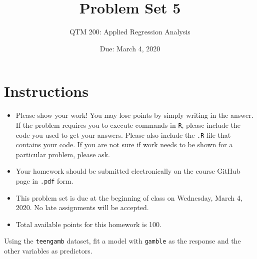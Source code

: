 \documentclass[12pt,letterpaper]{article}
\title{Problem Set 5}
\date{Due: March 4, 2020}
\author{QTM 200: Applied Regression Analysis}
\begin{document}
	\maketitle
	
	\section*{Instructions}
	\begin{itemize}
		\item Please show your work! You may lose points by simply writing in the answer. If the problem requires you to execute commands in \texttt{R}, please include the code you used to get your answers. Please also include the \texttt{.R} file that contains your code. If you are not sure if work needs to be shown for a particular problem, please ask.
		\item Your homework should be submitted electronically on the course GitHub page in \texttt{.pdf} form.
		\item This problem set is due at the beginning of class on Wednesday, March 4, 2020. No late assignments will be accepted.
		\item Total available points for this homework is 100.
	\end{itemize}
	
		\vspace{.5cm}
	
\noindent  Using the \texttt{teengamb} dataset, fit a model with \texttt{gamble} as the response and the other variables as predictors. 
\end{document}

